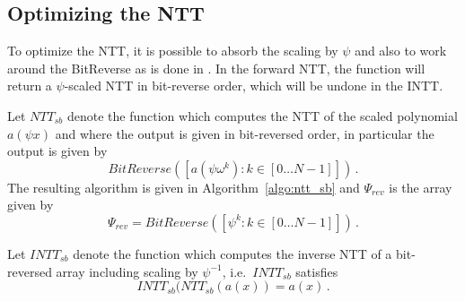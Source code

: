 \subsection{Optimizing the NTT}

To optimize the NTT, it is possible to absorb the scaling by $\psi$ and also to work around 
the BitReverse as is done in \cite{longa}.  In the forward NTT, the function will return a $\psi$-scaled NTT
in bit-reverse order, which will be undone in the INTT.

Let $NTT_{sb}$ denote the function which computes the NTT of the scaled polynomial $a(\psi x)$ and where the output 
is given in bit-reversed order, in particular the output is given by 
\[  BitReverse(  [a(\psi \omega^{k}) : k \in [0 \ldots N-1]]   ) \, .  \]
The resulting algorithm is given in Algorithm~\ref{algo:ntt_sb} and $\Psi_{rev}$ is the 
array given by 
\[ \Psi_{rev} = BitReverse( [ \psi^k  : k \in [0 \ldots N-1]] ) \, . \]

\begin{algorithm}[!t] \label{algo:ntt_sb}
\begin{scriptsize}
\caption{\emph{$NTT_{sb}$}}
\end{scriptsize}
\end{algorithm} 

Let $INTT_{sb}$ denote the function which computes the inverse NTT of a bit-reversed array 
including scaling by $\psi^{-1}$, i.e.\ $INTT_{sb}$ satisfies
\[ INTT_{sb} (NTT_{sb}(a(x)) = a(x) \, . \]

